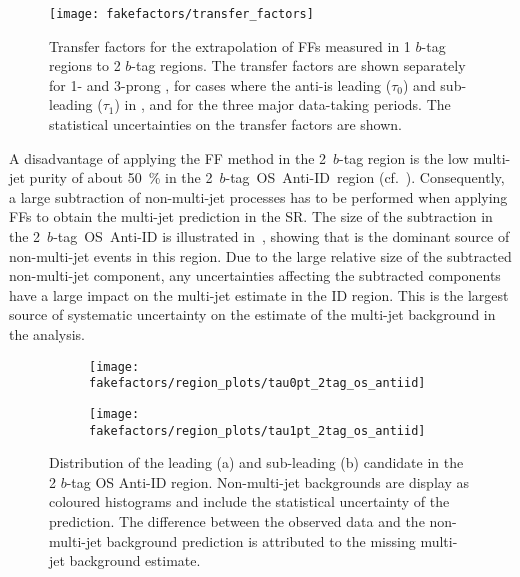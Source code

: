 \begin{figure}[htbp]
  \centering

  \texttt{[image: fakefactors/transfer\_factors]}

  \caption[Transfer factors for the extrapolation of FFs measured in 1 $b$-tag
  regions to 2 $b$-tag regions.]{Transfer factors for the extrapolation of FFs
    measured in 1 $b$-tag regions to 2 $b$-tag regions. The transfer factors are
    shown separately for 1- and 3-prong \tauhadvis, for cases where the
    anti-\tauhadvis is leading ($\tau_0$) and sub-leading ($\tau_1$) in \pT, and
    for the three major data-taking periods.  The statistical uncertainties on
    the transfer factors are shown.}%
  \label{fig:mjfakes_transfer_factor}
\end{figure}

A disadvantage of applying the FF method in the 2~$b$-tag region is the low
multi-jet purity of about \SI{50}{\percent} in the 2~$b$-tag~OS~Anti-ID~region
(cf.\ ). Consequently, a large subtraction of
non-multi-jet processes has to be performed when applying FFs to obtain the
multi-jet prediction in the SR.  The size of the subtraction in the
2~$b$-tag~OS~Anti-ID is illustrated in~,
showing that \ttbarFakes is the dominant source of non-multi-jet events in this
region. Due to the large relative size of the subtracted non-multi-jet
component, any uncertainties affecting the subtracted components have a large
impact on the multi-jet estimate in the ID region. This is the largest source of
systematic uncertainty on the estimate of the multi-jet background in the
analysis.

\begin{figure}[htbp]
  \centering

  \begin{subfigure}{0.49\textwidth}
    \texttt{[image: fakefactors/region\_plots/tau0pt\_2tag\_os\_antiid]}
    \subcaption{}
  \end{subfigure}%
  \begin{subfigure}{0.49\textwidth}
    \texttt{[image: fakefactors/region\_plots/tau1pt\_2tag\_os\_antiid]}
    \subcaption{}
  \end{subfigure}

  \caption[Distribution of the leading and sub-leading \tauhadvis candidate \pT
  in the 2 $b$-tag OS Anti-ID region.]{Distribution of the leading (a) and
    sub-leading (b) \tauhadvis candidate \pT in the 2 $b$-tag OS Anti-ID
    region. Non-multi-jet backgrounds are display as coloured histograms and
    include the statistical uncertainty of the prediction. The difference
    between the observed data and the non-multi-jet background prediction is
    attributed to the missing multi-jet background estimate.}%
  \label{fig:mjfakes_2tag_os_antiid}
\end{figure}


